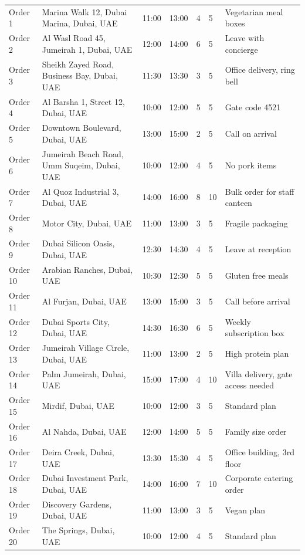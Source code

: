 \documentclass[11pt]{article}
\begin{document}
\begin{appendices}
\begin{landscape}
\begin{longtable}{@{}L{1.8cm}L{6cm}L{1.6cm}L{1.6cm}L{1.3cm}L{2.4cm}L{5.6cm}@{}}
Order 1  & Marina Walk 12, Dubai Marina, Dubai, UAE      & 11:00 & 13:00 & 4 & 5  & Vegetarian meal boxes \\
Order 2  & Al Wasl Road 45, Jumeirah 1, Dubai, UAE        & 12:00 & 14:00 & 6 & 5  & Leave with concierge \\
Order 3  & Sheikh Zayed Road, Business Bay, Dubai, UAE    & 11:30 & 13:30 & 3 & 5  & Office delivery, ring bell \\
Order 4  & Al Barsha 1, Street 12, Dubai, UAE              & 10:00 & 12:00 & 5 & 5  & Gate code 4521 \\
Order 5  & Downtown Boulevard, Dubai, UAE                  & 13:00 & 15:00 & 2 & 5  & Call on arrival \\
Order 6  & Jumeirah Beach Road, Umm Suqeim, Dubai, UAE     & 10:00 & 12:00 & 4 & 5  & No pork items \\
Order 7  & Al Quoz Industrial 3, Dubai, UAE                & 14:00 & 16:00 & 8 & 10 & Bulk order for staff canteen \\
Order 8  & Motor City, Dubai, UAE                          & 11:00 & 13:00 & 3 & 5  & Fragile packaging \\
Order 9  & Dubai Silicon Oasis, Dubai, UAE                 & 12:30 & 14:30 & 4 & 5  & Leave at reception \\
Order 10 & Arabian Ranches, Dubai, UAE                     & 10:30 & 12:30 & 5 & 5  & Gluten free meals \\
Order 11 & Al Furjan, Dubai, UAE                           & 13:00 & 15:00 & 3 & 5  & Call before arrival \\
Order 12 & Dubai Sports City, Dubai, UAE                   & 14:30 & 16:30 & 6 & 5  & Weekly subscription box \\
Order 13 & Jumeirah Village Circle, Dubai, UAE             & 11:00 & 13:00 & 2 & 5  & High protein plan \\
Order 14 & Palm Jumeirah, Dubai, UAE                       & 15:00 & 17:00 & 4 & 10 & Villa delivery, gate access needed \\
Order 15 & Mirdif, Dubai, UAE                              & 10:00 & 12:00 & 3 & 5  & Standard plan \\
Order 16 & Al Nahda, Dubai, UAE                            & 12:00 & 14:00 & 5 & 5  & Family size order \\
Order 17 & Deira Creek, Dubai, UAE                         & 13:30 & 15:30 & 4 & 5  & Office building, 3rd floor \\
Order 18 & Dubai Investment Park, Dubai, UAE               & 14:00 & 16:00 & 7 & 10 & Corporate catering order \\
Order 19 & Discovery Gardens, Dubai, UAE                   & 11:00 & 13:00 & 3 & 5  & Vegan plan \\
Order 20 & The Springs, Dubai, UAE                         & 10:00 & 12:00 & 4 & 5  & Standard plan \\


\end{longtable}
\end{landscape}
\end{appendices}
\end{document}
